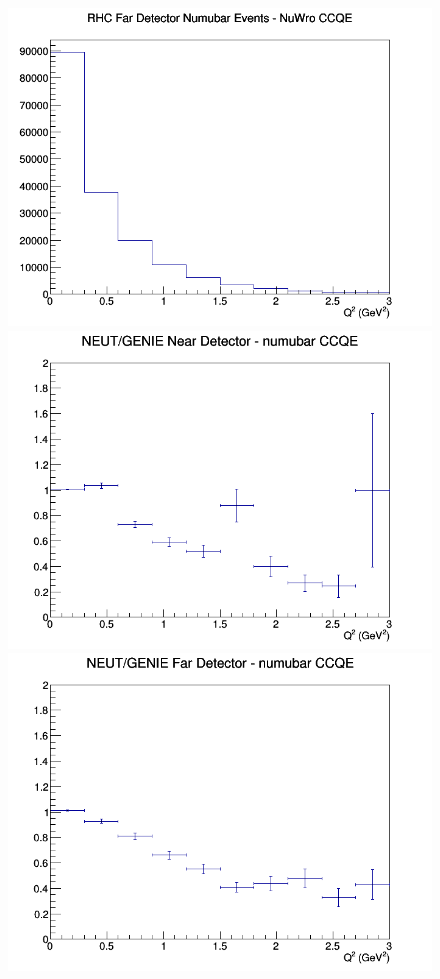 \begin{figure}[h]
\endminipage
{}
\includegraphics[width=\linewidth]{eff_Q2/FGT/CCQE_RHC_FD_numubar_Q2_NuWro.png}
\endminipage
\newline
{}
\includegraphics[width=\linewidth]{eff_Q2/FGT/ratios/CCQE_NEUT_GENIE_numubar_near_Q2.png}
\endminipage
{}
\includegraphics[width=\linewidth]{eff_Q2/FGT/ratios/CCQE_NEUT_GENIE_numubar_far_Q2.png}

\end{figure}
